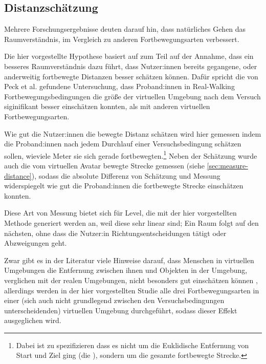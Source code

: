         \subsection{Distanzschätzung}
            Mehrere Forschungsergebnisse deuten darauf hin, dass natürliches Gehen das Raumverständnis, im Vergleich zu anderen Fortbewegungsarten verbessert. \cite{langbehn-vergleich-2018,peck-vergleich-2011, walking-improves-map-building} %

            Die hier vorgestellte Hypothese basiert auf zum Teil auf der Annahme, dass ein besseres Raumverständnis dazu führt, dass Nutzer:innen bereits gegangene, oder anderweitig fortbewegte Distanzen besser schätzen können. Dafür spricht die von Peck et al. \cite{peck-vergleich-2011} gefundene Untersuchung, dass Proband:innen in Real-Walking Fortbewegungsbedingungen die größe der virtuellen Umgebung nach dem Versuch siginifikant besser einschätzen konnten, als mit anderen virtuellen Fortbewegungsarten.

            Wie gut die Nutzer:innen die bewegte Distanz schätzen wird hier gemessen indem die Proband:innen nach jedem Durchlauf einer Versuchsbedingung schätzen sollen, wieviele Meter sie sich gerade fortbewegten.\footnote{Dabei ist zu spezifizieren dass es nicht um die Euklidische Entfernung von Start und Ziel ging (die ), sondern um die gesamte fortbewegte Strecke.}
            Neben der Schätzung wurde auch die vom virtuellen Avatar bewegte Strecke gemessen (siehe \autoref{sec:measure-distance}), sodass die absolute Differenz von Schätzung und Messung widerspiegelt wie gut die Proband:innen die fortbewegte Strecke einschätzen konnten.

            Diese Art von Messung bietet sich für Level, die mit der hier vorgestellten Methode generiert werden an, weil diese sehr linear sind; Ein Raum folgt auf den nächsten, ohne dass die Nutzer:in Richtungsentscheidungen tätigt oder Abzweigungen geht.

            Zwar gibt es in der Literatur viele Hinweise darauf, dass Menschen in virtuellen Umgebungen die Entfernung zwischen ihnen und Objekten in der Umgebung, verglichen mit der realen Umgebungen,  nicht besonders gut einschätzen können \cite{meta-distance-perception, bruder-distance}, %
            allerdings werden in der hier vorgestellten Studie alle drei Fortbewegungsarten in einer (sich auch nicht grundlegend zwischen den Versuchsbedingungen unterscheidenden) virtuellen Umgebung durchgeführt, sodass dieser Effekt ausgeglichen wird.


